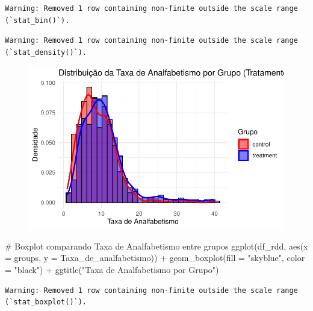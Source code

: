 \documentclass[
  letterpaper,
  DIV=11,
  numbers=noendperiod]{scrartcl}
\newenvironment{Shaded}{\begin{snugshade}}{\end{snugshade}}
\newcommand{\AttributeTok}[1]{\textcolor[rgb]{0.40,0.45,0.13}{#1}}
\newcommand{\CommentTok}[1]{\textcolor[rgb]{0.37,0.37,0.37}{#1}}
\newcommand{\FunctionTok}[1]{\textcolor[rgb]{0.28,0.35,0.67}{#1}}
\newcommand{\NormalTok}[1]{\textcolor[rgb]{0.00,0.23,0.31}{#1}}
\newcommand{\SpecialCharTok}[1]{\textcolor[rgb]{0.37,0.37,0.37}{#1}}
\newcommand{\StringTok}[1]{\textcolor[rgb]{0.13,0.47,0.30}{#1}}
\begin{document}
\begin{verbatim}
Warning: Removed 1 row containing non-finite outside the scale range
(`stat_bin()`).
\end{verbatim}

\begin{verbatim}
Warning: Removed 1 row containing non-finite outside the scale range
(`stat_density()`).
\end{verbatim}

\begin{figure}[H]

{\centering \includegraphics{maps_files/figure-pdf/unnamed-chunk-16-1.pdf}

}

\end{figure}

\begin{Shaded}
\begin{Highlighting}[]
\CommentTok{\# Boxplot comparando Taxa de Analfabetismo entre grupos}
\FunctionTok{ggplot}\NormalTok{(df\_rdd, }\FunctionTok{aes}\NormalTok{(}\AttributeTok{x =}\NormalTok{ groups, }\AttributeTok{y =}\NormalTok{ Taxa\_de\_analfabetismo)) }\SpecialCharTok{+}
  \FunctionTok{geom\_boxplot}\NormalTok{(}\AttributeTok{fill =} \StringTok{"skyblue"}\NormalTok{, }\AttributeTok{color =} \StringTok{"black"}\NormalTok{) }\SpecialCharTok{+}
  \FunctionTok{ggtitle}\NormalTok{(}\StringTok{"Taxa de Analfabetismo por Grupo"}\NormalTok{)}
\end{Highlighting}
\end{Shaded}

\begin{verbatim}
Warning: Removed 1 row containing non-finite outside the scale range
(`stat_boxplot()`).
\end{verbatim}
\end{document}
